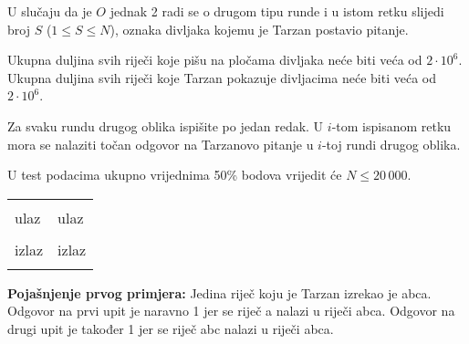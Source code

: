 U slučaju da je $O$ jednak 2 radi se o drugom tipu runde i u istom retku slijedi broj $S$ ($1 \leqslant S \leqslant N$), oznaka divljaka kojemu je Tarzan postavio pitanje.

Ukupna duljina svih riječi koje pišu na pločama divljaka neće biti veća od $2\cdot10^6$.
Ukupna duljina svih riječi koje Tarzan pokazuje divljacima neće biti veća od $2\cdot10^6$.

\strut


Za svaku rundu drugog oblika ispišite po jedan redak. U $i$-tom ispisanom retku mora se nalaziti točan odgovor na Tarzanovo pitanje u $i$-toj rundi drugog oblika.

\strut


U test podacima ukupno vrijednima 50\% bodova vrijedit će $N \leqslant 20\,000$.

\pagebreak


\begin{center}
\fontfamily{\ttdefault}
\fontsize{10pt}{1em}
\selectfont
\begin{tabu}to 0.99\textwidth{|X[1]|X[1]|}
\hline
& \\ 
\rowfont{\fontsize{10pt}{1em}\bfseries}
ulaz & ulaz \\
 & 
 \\
\rowfont{\fontsize{10pt}{1em}\bfseries}
izlaz & izlaz \\
 & 
 \\
\hline
\end{tabu}
\end{center}

{
\fontsize{10pt}{1em}
\selectfont
\textbf{Pojašnjenje prvog primjera:} Jedina riječ koju je Tarzan izrekao je abca. Odgovor na prvi upit je naravno 1 jer se riječ a nalazi u riječi abca. Odgovor na drugi upit je također 1 jer se riječ abc nalazi u riječi abca. \\
}